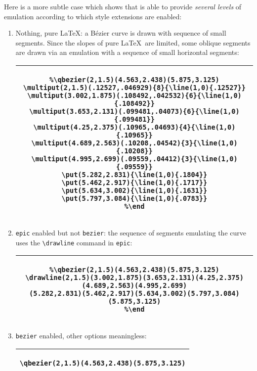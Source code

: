 \documentclass[11pt,a4paper]{article}
\begin{document}
\begin{enumerate}
Here is a more subtle case which shows that {\TC} is able to
provide {\it several levels} of emulation according to which style
extensions are enabled:
\begin{enumerate}
\item Nothing, pure \LaTeX : a B\'ezier curve is drawn with sequence of small
segments.
Since the slopes of pure \LaTeX\, are limited, some
oblique segments are drawn via an emulation with a sequence of small horizontal
segments:
  \begin{center}\tiny{
    \begin{tabular}{|c|}
    \hline
    \begin{minipage}[t]{0.75\linewidth}
    \begin{verbatim}
%\qbezier(2,1.5)(4.563,2.438)(5.875,3.125)
\multiput(2,1.5)(.12527,.046929){8}{\line(1,0){.12527}}
\multiput(3.002,1.875)(.108492,.042532){6}{\line(1,0){.108492}}
\multiput(3.653,2.131)(.099481,.04073){6}{\line(1,0){.099481}}
\multiput(4.25,2.375)(.10965,.04693){4}{\line(1,0){.10965}}
\multiput(4.689,2.563)(.10208,.04542){3}{\line(1,0){.10208}}
\multiput(4.995,2.699)(.09559,.04412){3}{\line(1,0){.09559}}
\put(5.282,2.831){\line(1,0){.1804}}
\put(5.462,2.917){\line(1,0){.1717}}
\put(5.634,3.002){\line(1,0){.1631}}
\put(5.797,3.084){\line(1,0){.0783}}
%\end
    \end{verbatim}
    \end{minipage}\\
    \hline
    \end{tabular}
  }\end{center}
\item {\tt epic} enabled but not {\tt bezier}: the sequence of segments emulating the curve
uses the \verb+\drawline+ command in {\tt epic}:
  \begin{center}\tiny{
    \begin{tabular}{|c|}
    \hline
    \begin{minipage}[t]{0.75\linewidth}
    \begin{verbatim}
%\qbezier(2,1.5)(4.563,2.438)(5.875,3.125)
\drawline(2,1.5)(3.002,1.875)(3.653,2.131)(4.25,2.375)(4.689,2.563)(4.995,2.699)
(5.282,2.831)(5.462,2.917)(5.634,3.002)(5.797,3.084)(5.875,3.125)
%\end
    \end{verbatim}
    \end{minipage}\\
    \hline
    \end{tabular}
  }\end{center}
\item {\tt bezier} enabled, other options meaningless:
  \begin{center}\footnotesize{
    \begin{tabular}{|c|}
    \hline
    \begin{minipage}[t]{0.75\linewidth}
    \begin{verbatim}
\qbezier(2,1.5)(4.563,2.438)(5.875,3.125)
    \end{verbatim}
    \end{minipage}\\
    \hline
    \end{tabular}
  }\end{center}


\end{enumerate}
\end{enumerate}
\end{document}
